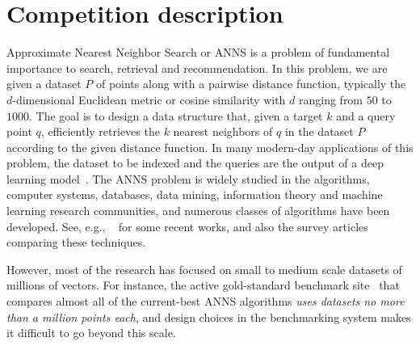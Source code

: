 
\section{Competition description}

Approximate Nearest Neighbor Search or ANNS is a problem of
fundamental importance to search, retrieval and recommendation.  In
this problem, we are given a dataset $P$ of points along with a
pairwise distance function, typically the $d$-dimensional Euclidean
metric or cosine similarity with $d$ ranging from $50$ to $1000$. The
goal is to design a data structure that, given a target $k$ and a
query point $q$, efficiently retrieves the $k$ nearest neighbors of 
$q$ in the dataset $P$ according to the given distance function. In
many modern-day applications of this problem, the dataset to be
indexed and the queries are the output of a deep learning
model~\citep{deep1b-link,BERT}.  The ANNS problem is widely studied in
the algorithms, computer systems, databases, data mining, information
theory and machine learning research communities, and numerous classes
of algorithms have been developed. See, e.g.,
~\citep{CoverTree,babenko2014additive,Faiss17,Weber98,ECCV18,HNSW16,PQ11,Arya93,Indyk98,onng,scann,puffinn}
for some recent works, and also the survey
articles~\citep{samet2006foundations, LSHSurvey08, LearningToHash18,
  GraphANNSSurvey21} comparing these techniques.

However, most of the research has focused on small to medium scale
datasets of millions of vectors. For instance, the active
gold-standard benchmark site~\citep{Benchmark} that compares almost all
of the current-best ANNS algorithms \emph{uses datasets no more than a
  million points each}, and design choices in the benchmarking system
makes it difficult to go beyond this scale.

